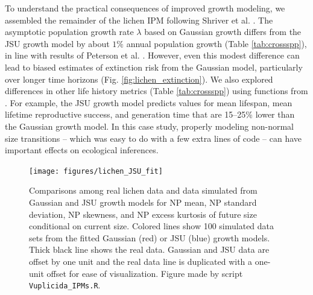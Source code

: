 \documentclass[12pt]{article}
\begin{document}
\begin{spacing}{1.9}
To understand the practical consequences of improved growth modeling, we assembled the remainder of the lichen IPM following Shriver et al. \citeyear{shriver2012comparative}. 
The asymptotic population growth rate $\lambda$ based on Gaussian growth differs from the JSU growth model by about $1\%$ annual population growth (Table \ref{tab:crossspp}), in line with results of Peterson et al. \citeyear{peterson2019improving}. 
However, even this modest difference can lead to biased estimates of extinction risk from the Gaussian model, particularly over longer time horizons (Fig. \ref{fig:lichen_extinction}). 
We also explored differences in other life history metrics (Table \ref{tab:crossspp}) using functions from \cite{hernandez-etal-2024}.
For example, the JSU growth model predicts values for mean lifespan, mean lifetime reproductive success, and generation time that are 15--25\% lower than the Gaussian growth model. 
In this case study, properly modeling non-normal size transitions -- which was easy to do with a few extra lines of code -- can have important effects on ecological inferences. 
\begin{figure}[tbp]
	\centering
	\texttt{[image: figures/lichen\_JSU\_fit]}
	\caption{Comparisons among real lichen data and data simulated from Gaussian and JSU growth models for NP mean, NP standard deviation, NP skewness, and NP excess kurtosis of future size conditional on current size. Colored lines show 100 simulated data sets from the fitted Gaussian (red) or JSU (blue) growth models. Thick black line shows the real data. Gaussian and JSU data are offset by one unit and the real data line is duplicated with a one-unit offset for ease of visualization. Figure made by script \texttt{Vuplicida\_IPMs.R}.}
	\label{fig:lichen_fit}
\end{figure} 


\end{spacing}
\end{document}
